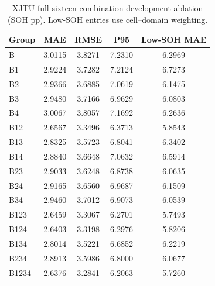\begin{table}[!htbp]
\centering
\caption{XJTU full sixteen-combination development ablation (SOH pp). Low-SOH entries use cell--domain weighting.}
\label{tab:allablXJTU}
\footnotesize
\setlength{\tabcolsep}{4pt}
\begin{tabular}{lcccc}
\toprule
Group & MAE & RMSE & P95 & Low-SOH MAE \\
\midrule
B & 3.0115 & 3.8271 & 7.2310 & 6.2969 \\
B1 & 2.9224 & 3.7282 & 7.2124 & 6.7273 \\
B2 & 2.9366 & 3.6885 & 7.0619 & 6.1475 \\
B3 & 2.9480 & 3.7166 & 6.9629 & 6.0803 \\
B4 & 3.0067 & 3.8057 & 7.1692 & 6.2636 \\
B12 & 2.6567 & 3.3496 & 6.3713 & 5.8543 \\
B13 & 2.8325 & 3.5723 & 6.8041 & 6.3402 \\
B14 & 2.8840 & 3.6648 & 7.0632 & 6.5914 \\
B23 & 2.9033 & 3.6248 & 6.8738 & 6.0635 \\
B24 & 2.9165 & 3.6560 & 6.9687 & 6.1509 \\
B34 & 2.9460 & 3.7012 & 6.9073 & 6.0539 \\
B123 & 2.6459 & 3.3067 & 6.2701 & 5.7493 \\
B124 & 2.6403 & 3.3198 & 6.2976 & 5.8206 \\
B134 & 2.8014 & 3.5221 & 6.6852 & 6.2219 \\
B234 & 2.8913 & 3.5986 & 6.8000 & 6.0677 \\
B1234 & 2.6376 & 3.2841 & 6.2063 & 5.7260 \\
\bottomrule
\end{tabular}
\end{table}
